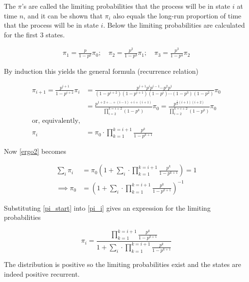 The $\pi$'s are called the limiting probabilities that the process will be in state $i$ at time $n$, and it can be shown that $\pi_i$ also equals the long-run proportion of time that the process will be in state $i$. Below the limiting probabilities are calculated for the first 3 states.

\begin{align*}
\pi_1 =  \frac{p}{1-p^2} \pi_0; \quad
\pi_2 =  \frac{p^2}{1-p^3} \pi_1; \quad
\pi_3 =  \frac{p^3}{1-p^4} \pi_2
\end{align*}

By induction this yields the general formula (recurrence relation)

\begin{equation}
\label{pi_i}
\begin{aligned}
\pi_{i+1} =  \frac{p^{i+1}}{1-p^{i+2}} \pi_{i}
  &= \frac{p^{i+1}p^{i}p^{i-1} \cdots p^{2} p^{1}}{(1-p^{i+2})(1-p^{i+1})(1-p^{i}) \cdots (1-p^{3})(1-p^{2})} \pi_{0} \\
  &= \frac{p^{1+2+...+(i-1)+i+(i+1)}}{\prod_{i=2}^{k=i+2} (1-p^{k})} \pi_{0} 
  = \frac{p^{\frac{1}{2}(i+1)(i+2)}}{\prod_{i=2}^{k=i+2} (1-p^{k})} \pi_{0} \\
  \text{or, equivalently,} \\
\pi_{i} &= \pi_{0} \cdot \prod_{k=1}^{k=i+1}  \frac{p^k}{1-p^{k+1}}
 \end{aligned}
\end{equation}

Now \cref{ergo2} becomes

\begin{equation}
\label{pi_start}
\begin{aligned}
\sum_i \pi_{i} &= \pi_{0} \left(1 + \sum_i \cdot \prod_{k=1}^{k=i+1}  \frac{p^k}{1-p^{k+1}} \right) = 1 \\
\implies
\pi_{0} &= \left(1 + \sum_i \cdot \prod_{k=1}^{k=i+1}  \frac{p^k}{1-p^{k+1}} \right)^{-1}
\end{aligned}
\end{equation}

Substituting \cref{pi_start} into \cref{pi_i} gives an expression for the limiting probabilities

\begin{equation}
\pi_{i} = \frac{\prod_{k=1}^{k=i+1}  \frac{p^k}{1-p^{k+1}}}{1 + \sum_i \cdot \prod_{k=1}^{k=i+1}  \frac{p^k}{1-p^{k+1}}} 
\end{equation}


The distribution is positive so the limiting probabilities exist and the states are indeed positive recurrent. 


